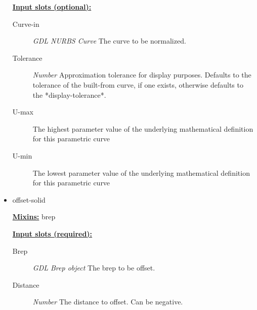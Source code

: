 \documentclass [11pt]{book}
\begin{document}
\begin{itemize}
\begin{description}
\end{description}








\textbf{
\underline{Input slots (optional):}}

\begin{description}

\item [Curve-in]
\emph{GDL NURBS Curve} The curve to be normalized.


\item [Tolerance]
\emph{Number} Approximation tolerance for display purposes. Defaults to the tolerance of the
built-from curve, if one exists, otherwise defaults to the *display-tolerance*.


\item [U-max]
The highest parameter value of the underlying mathematical definition
for this parametric curve


\item [U-min]
The lowest parameter value of the underlying mathematical definition
for this parametric curve


\end{description}







\item {}offset-solid


\textbf{
\underline{Mixins:}} brep





\begin{description}

\end{description}








\textbf{
\underline{Input slots (required):}}

\begin{description}

\item [Brep]
\emph{GDL Brep object} The brep to be offset.


\item [Distance]
\emph{Number} The distance to offset. Can be negative.



\end{description}
\end{itemize}
\end{document}
